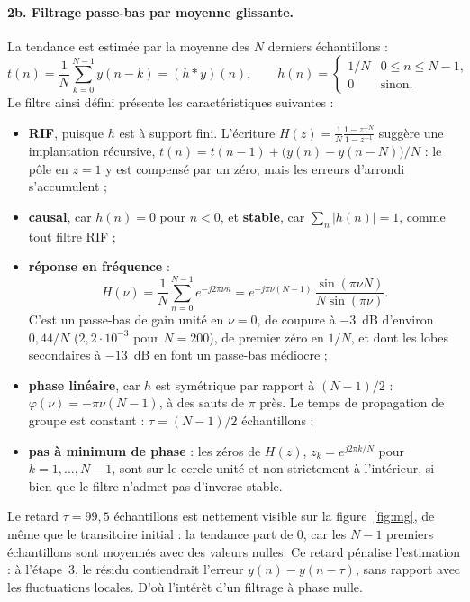 \documentclass[11pt,a4paper]{article}
\begin{document}
\paragraph{2b. Filtrage passe-bas par moyenne glissante.}
La tendance est estimée par la moyenne des $N$ derniers échantillons :
\begin{equation}
  t(n) = \frac{1}{N} \sum_{k=0}^{N-1} y(n-k) = (h * y)(n),
  \qquad
  h(n) =
  \begin{cases}
    1/N & 0 \leq n \leq N-1,\\
    0 & \text{sinon.}
  \end{cases}
  \label{eq:mg}
\end{equation}
Le filtre ainsi défini présente les caractéristiques suivantes :
\begin{itemize}
  \item \textbf{RIF}, puisque $h$ est à support fini. L'écriture $H(z) = \frac{1}{N}\frac{1 - z^{-N}}{1 - z^{-1}}$ suggère une implantation récursive, $t(n) = t(n-1) + \big(y(n) - y(n-N)\big)/N$ : le pôle en $z = 1$ y est compensé par un zéro, mais les erreurs d'arrondi s'accumulent ;
  \item \textbf{causal}, car $h(n) = 0$ pour $n < 0$, et \textbf{stable}, car $\sum_n |h(n)| = 1$, comme tout filtre RIF ;
  \item \textbf{réponse en fréquence} :
  \begin{equation}
    H(\nu) = \frac{1}{N} \sum_{n=0}^{N-1} e^{-j2\pi\nu n} = e^{-j\pi\nu(N-1)}\, \frac{\sin(\pi\nu N)}{N \sin(\pi\nu)}.
    \label{eq:H_mg}
  \end{equation}
  C'est un passe-bas de gain unité en $\nu = 0$, de coupure à $-3$~dB d'environ $0{,}44/N$ ($2{,}2 \cdot 10^{-3}$ pour $N = 200$), de premier zéro en $1/N$, et dont les lobes secondaires à $-13$~dB en font un passe-bas médiocre ;
  \item \textbf{phase linéaire}, car $h$ est symétrique par rapport à $(N-1)/2$ : $\varphi(\nu) = -\pi\nu(N-1)$, à des sauts de $\pi$ près. Le temps de propagation de groupe est constant : $\tau = (N-1)/2$ échantillons ;
  \item \textbf{pas à minimum de phase} : les zéros de $H(z)$, $z_k = e^{j2\pi k/N}$ pour $k = 1, \dots, N-1$, sont sur le cercle unité et non strictement à l'intérieur, si bien que le filtre n'admet pas d'inverse stable.
\end{itemize}
Le retard $\tau = 99{,}5$ échantillons est nettement visible sur la figure~\ref{fig:mg}, de même que le transitoire initial : la tendance part de 0, car les $N-1$ premiers échantillons sont moyennés avec des valeurs nulles. Ce retard pénalise l'estimation : à l'étape~3, le résidu contiendrait l'erreur $y(n) - y(n - \tau)$, sans rapport avec les fluctuations locales. D'où l'intérêt d'un filtrage à phase nulle.
\end{document}
